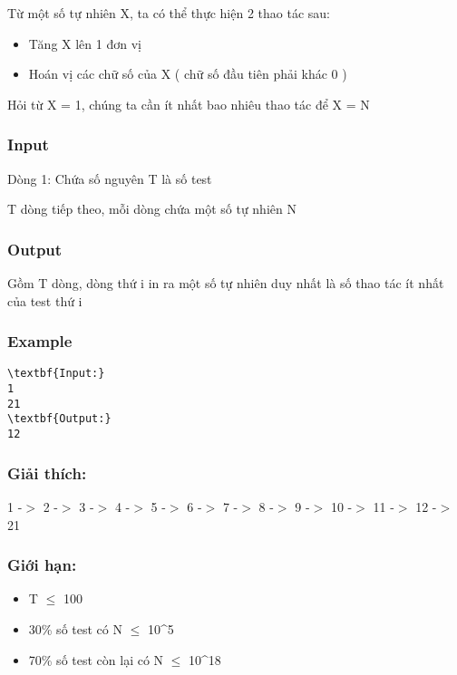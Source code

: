

Từ một số tự nhiên X, ta có thể thực hiện 2 thao tác sau:
\begin{itemize}
	\item Tăng X lên 1 đơn vị
	\item Hoán vị các chữ số của X ( chữ số đầu tiên phải khác 0 )
\end{itemize}

Hỏi từ X = 1, chúng ta cần ít nhất bao nhiêu thao tác để X = N

\subsubsection{Input}

Dòng 1: Chứa số nguyên T là số test

T dòng tiếp theo, mỗi dòng chứa một số tự nhiên N

\subsubsection{Output}

Gồm T dòng, dòng thứ i in ra một số tự nhiên duy nhất là số thao tác ít nhất của test thứ i

\subsubsection{Example}
\begin{verbatim}
\textbf{Input:}
1
21
\textbf{Output:}
12\end{verbatim}

\subsubsection{Giải thích:}

1 -$>$ 2 -$>$ 3 -$>$ 4 -$>$ 5 -$>$ 6 -$>$ 7 -$>$ 8 -$>$ 9 -$>$ 10 -$>$ 11 -$>$ 12 -$>$ 21

\subsubsection{Giới hạn:}
\begin{itemize}
	\item T  $\le$  100
	\item 30\% số test có N  $\le$  10\textasciicircum5
	\item 70\% số test còn lại có N  $\le$  10\textasciicircum18
\end{itemize}
